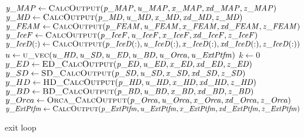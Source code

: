 \documentclass[10pt,letterpaper,oneside,notitlepage]{article}
\begin{document}
\begin{algorithmic}[1]

   \State
   \State $\mathit{y\_MAP}     \gets \Call{CalcOutput}{\mathit{p\_MAP},\mathit{u\_MAP},\mathit{x\_MAP},\mathit{xd\_MAP},\mathit{z\_MAP}}$ 
   \State $\mathit{y\_MD}      \gets \Call{CalcOutput}{\mathit{p\_MD},\mathit{u\_MD},\mathit{x\_MD},\mathit{xd\_MD},\mathit{z\_MD}}$
   \State $\mathit{y\_FEAM}    \gets \Call{CalcOutput}{\mathit{p\_FEAM},\mathit{u\_FEAM},\mathit{x\_FEAM},\mathit{xd\_FEAM},\mathit{z\_FEAM}}$
   \State $\mathit{y\_IceF}    \gets \Call{CalcOutput}{\mathit{p\_IceF},\mathit{u\_IceF},\mathit{x\_IceF},\mathit{xd\_IceF},\mathit{z\_IceF}}$
   \State $\mathit{y\_IceD(:)} \gets \Call{CalcOutput}{\mathit{p\_IceD(:)},\mathit{u\_IceD(:)},\mathit{x\_IceD(:)},\mathit{xd\_IceD(:)},\mathit{z\_IceD(:)}}$
   \State
   \State{}
   \State
   \State $u \gets \Call{u\_vec}{\mathit{u\_HD},\mathit{u\_SD},\mathit{u\_ED},\mathit{u\_BD},\mathit{u\_Orca},\mathit{u\_ExtPtfm}}$
   \State $k \gets 0$
   \Loop{}
      \State $y\_ED   \gets \Call{ED\_CalcOutput}{\mathit{p\_ED},\mathit{u\_ED},\mathit{x\_ED},\mathit{xd\_ED},\mathit{z\_ED}}$
      \State $y\_SD   \gets \Call{SD\_CalcOutput}{\mathit{p\_SD},\mathit{u\_SD},\mathit{x\_SD},\mathit{xd\_SD},\mathit{z\_SD}}$
      \State $y\_HD   \gets \Call{HD\_CalcOutput}{\mathit{p\_HD},\mathit{u\_HD},\mathit{x\_HD},\mathit{xd\_HD},\mathit{z\_HD}}$
      \State $y\_BD   \gets \Call{BD\_CalcOutput}{\mathit{p\_BD},\mathit{u\_BD},\mathit{x\_BD},\mathit{xd\_BD},\mathit{z\_BD}}$
      \State $y\_Orca \gets \Call{Orca\_CalcOutput}{\mathit{p\_Orca},\mathit{u\_Orca},\mathit{x\_Orca},\mathit{xd\_Orca},\mathit{z\_Orca}}$
      \State $\mathit{y\_ExtPtfm}     \gets \Call{CalcOutput}{\mathit{p\_ExtPtfm},\mathit{u\_ExtPtfm},\mathit{x\_ExtPtfm},\mathit{xd\_ExtPtfm},\mathit{z\_ExtPtfm}}$ 
   
         \State exit loop
      \EndIf
      

\end{algorithmic}
\end{document}
